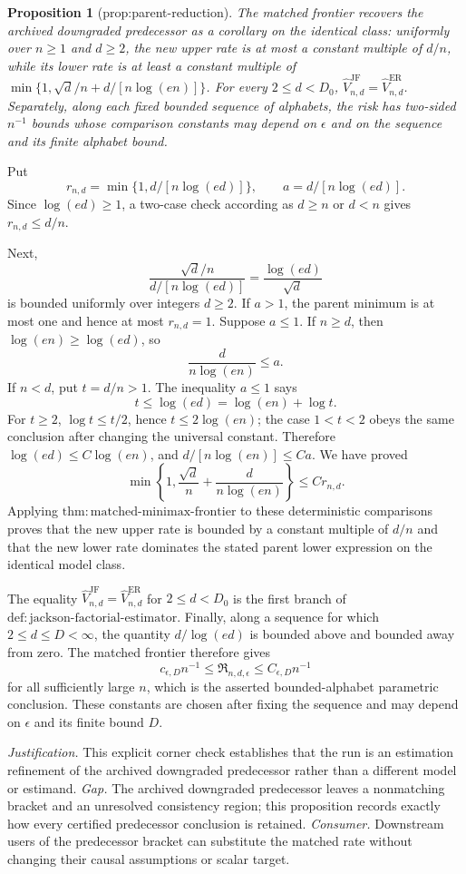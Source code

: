 \documentclass{article}
\newtheorem{proposition}{Proposition}
\begin{document}
\begin{proposition}[prop:parent-reduction]\label{prop:parent-reduction}
The matched frontier recovers the archived downgraded predecessor as a corollary on the identical class: uniformly over \(n\geq1\) and \(d\geq2\), the new upper rate is at most a constant multiple of \(d/n\), while its lower rate is at least a constant multiple of \(\min\{1,\sqrt d/n+d/[n\log(en)]\}\). For every \(2\leq d<D_0\), \(\widehat V_{n,d}^{\mathrm{JF}}=\widehat V_{n,d}^{\mathrm{ER}}\). Separately, along each fixed bounded sequence of alphabets, the risk has two-sided \(n^{-1}\) bounds whose comparison constants may depend on \(\epsilon\) and on the sequence and its finite alphabet bound.
\end{proposition}
Put
\[
 r_{n,d}=\min\{1,d/[n\log(ed)]\},
 \qquad a=d/[n\log(ed)].
\]
Since \(\log(ed)\geq1\), a two-case check according as \(d\geq n\) or \(d<n\) gives \(r_{n,d}\leq d/n\).

Next,
\[
 \frac{\sqrt d/n}{d/[n\log(ed)]}=\frac{\log(ed)}{\sqrt d}
\]
is bounded uniformly over integers \(d\geq2\).  If \(a>1\), the parent minimum is at most one and hence at most \(r_{n,d}=1\).  Suppose \(a\leq1\).  If \(n\geq d\), then \(\log(en)\geq\log(ed)\), so
\[
 \frac d{n\log(en)}\leq a.
\]
If \(n<d\), put \(t=d/n>1\).  The inequality \(a\leq1\) says
\[
 t\leq\log(ed)=\log(en)+\log t.
\]
For \(t\geq2\), \(\log t\leq t/2\), hence \(t\leq2\log(en)\); the case \(1<t<2\) obeys the same conclusion after changing the universal constant.  Therefore \(\log(ed)\leq C\log(en)\), and \(d/[n\log(en)]\leq Ca\).  We have proved
\[
 \min\left\{1,\frac{\sqrt d}{n}+\frac d{n\log(en)}\right\}
 \leq C r_{n,d}.                                                     \tag{23}
\]
Applying \(\mathrm{thm:matched\mbox{-}minimax\mbox{-}frontier}\) to these deterministic comparisons proves that the new upper rate is bounded by a constant multiple of \(d/n\) and that the new lower rate dominates the stated parent lower expression on the identical model class.

The equality \(\widehat V_{n,d}^{\mathrm{JF}}=\widehat V_{n,d}^{\mathrm{ER}}\) for \(2\leq d<D_0\) is the first branch of \(\mathrm{def:jackson\mbox{-}factorial\mbox{-}estimator}\).  Finally, along a sequence for which \(2\leq d\leq D<\infty\), the quantity \(d/\log(ed)\) is bounded above and bounded away from zero.  The matched frontier therefore gives
\[
 c_{\epsilon,D}n^{-1}\leq\mathfrak R_{n,d,\epsilon}
 \leq C_{\epsilon,D}n^{-1}
\]
for all sufficiently large \(n\), which is the asserted bounded-alphabet parametric conclusion.  These constants are chosen after fixing the sequence and may depend on \(\epsilon\) and its finite bound \(D\).
\par\smallskip\noindent \textit{Justification.} This explicit corner check establishes that the run is an estimation refinement of the archived downgraded predecessor rather than a different model or estimand. \textit{Gap.} The archived downgraded predecessor leaves a nonmatching bracket and an unresolved consistency region; this proposition records exactly how every certified predecessor conclusion is retained. \textit{Consumer.} Downstream users of the predecessor bracket can substitute the matched rate without changing their causal assumptions or scalar target.
\end{document}
